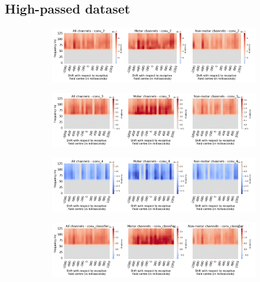 \subsection*{High-passed dataset}\label{subsec:absVel-high-passed-dataset-appendixC}
\begin{figure}[!htpb]
\centering
\begin{subfigure}[b]{\textwidth}
   \includegraphics[width=1\linewidth]{img/appendix/C/hp-m/absVel/sbp0_hp_m_shift_gradients_conv_2_all_kinds}
   \caption{}
   \label{fig:absVel-hp-shifting-grads-conv-2}
\end{subfigure}

\begin{subfigure}[b]{\textwidth}
   \includegraphics[width=1\linewidth]{img/appendix/C/hp-m/absVel/sbp0_hp_m_shift_gradients_conv_3_all_kinds}
   \caption{}
   \label{fig:absVel-hp-shifting-grads-conv-3}
\end{subfigure}

\begin{subfigure}[b]{\textwidth}
   \includegraphics[width=1\linewidth]{img/appendix/C/hp-m/absVel/sbp0_hp_m_shift_gradients_conv_4_all_kinds}
   \caption{}
   \label{fig:absVel-hp-shifting-grads-conv-4}
\end{subfigure}

\begin{subfigure}[b]{\textwidth}
   \includegraphics[width=1\linewidth]{img/appendix/C/hp-m/absVel/sbp0_hp_m_shift_gradients_conv_classifier_all_kinds}
   \caption{}
   \label{fig:absVel-hp-shifting-grads-conv-classifier}
\end{subfigure}

\caption[]{}
\label{fig:absVel-hp-shifting-grads}
\end{figure}